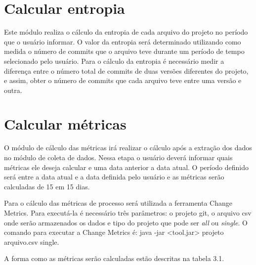 \section{Calcular entropia}
Este módulo realiza o cálculo da entropia de cada arquivo do projeto no período que o usuário informar. O valor da entropia será determinado utilizando como medida o número de commits que o arquivo teve durante um período de tempo selecionado pelo usuário. Para o cálculo da entropia é necessário medir a diferença entre o número total de commits de duas versões diferentes do projeto, e assim, obter o número de commits que cada arquivo teve entre uma versão e outra.

\section{Calcular métricas}
O módulo de cálculo das métricas irá realizar o cálculo após a extração dos dados no módulo de coleta de dados. Nessa etapa o usuário deverá informar quais métricas ele deseja calcular e uma data anterior a data atual. O período definido será entre a data atual e a data definida pelo usuário e as métricas serão calculadas de 15 em 15 dias.

Para o cálculo das métricas de processo será utilizada a ferramenta Change Metrics. Para executá-la é necessário três parâmetros: o projeto git, o arquivo csv onde serão armazenados os dados e tipo do projeto que pode ser \textit{all} ou \textit{single}. O comando para executar a Change Metrics é: java -jar <tool.jar> projeto arquivo.csv single. 

A forma como as métricas serão calculadas estão descritas na tabela 3.1. 

